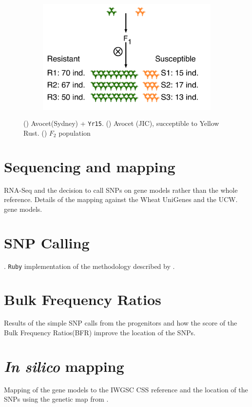 \begin{figure}
    \begin{subfigure}[b]{6cm}
        \includegraphics[width=1\textwidth]{Yr15/Figures/population/F2Population.pdf} 
        \caption{}
        \label{fig:yr15:F2Pop}
    \end{subfigure}
    \caption{ () Avocet(Sydney) + \texttt{Yr15}. () Avocet (JIC), succeptible to Yellow Rust.  () $F_{2}$ population}
\end{figure}

\section{Sequencing and mapping} 

RNA-Seq and the decision to call SNPs on gene models rather than the whole reference.  Details of the mapping against the Wheat UniGenes \cite{PontiusJUWagnerL2002} and the UCW. \cite{Krasileva2013} gene models.  

\section{SNP Calling}. 
\verb|Ruby| implementation of the methodology described by \citet{Trick2012}. 

\section{Bulk Frequency Ratios} 
Results of the simple SNP calls from the progenitors and how the score of the Bulk Frequency Ratios(BFR) improve the location of the SNPs. 

\section{\textit{In silico} mapping}
Mapping of the gene models to the IWGSC CSS \cite{Mayer2014} reference and the location of the SNPs using the genetic map from \citet{Wang2014}.

